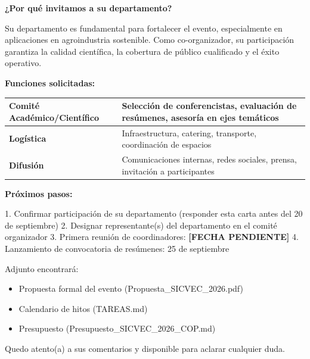 \documentclass[12pt,a4paper]{article}
\begin{document}
\vspace{0.8cm}

\textbf{¿Por qué invitamos a su departamento?}

Su departamento es fundamental para fortalecer el evento, especialmente en aplicaciones en agroindustria sostenible. Como co-organizador, su participación garantiza la calidad científica, la cobertura de público cualificado y el éxito operativo.

\vspace{1cm}

\textbf{Funciones solicitadas:}

\begin{tabular}{|l|p{10cm}|}
\hline
\textbf{Comité Académico/Científico} & Selección de conferencistas, evaluación de resúmenes, asesoría en ejes temáticos \\
\hline
\textbf{Logística} & Infraestructura, catering, transporte, coordinación de espacios \\
\hline
\textbf{Difusión} & Comunicaciones internas, redes sociales, prensa, invitación a participantes \\
\hline
\end{tabular}

\vspace{1cm}

\textbf{Próximos pasos:}

1. Confirmar participación de su departamento (responder esta carta antes del 20 de septiembre)
2. Designar representante(s) del departamento en el comité organizador
3. Primera reunión de coordinadores: \textbf{[FECHA PENDIENTE]}
4. Lanzamiento de convocatoria de resúmenes: 25 de septiembre

\vspace{1cm}

Adjunto encontrará:
\begin{itemize}
  \item Propuesta formal del evento (Propuesta\_SICVEC\_2026.pdf)
  \item Calendario de hitos (TAREAS.md)
  \item Presupuesto (Presupuesto\_SICVEC\_2026\_COP.md)
\end{itemize}

\vspace{1cm}

Quedo atento(a) a sus comentarios y disponible para aclarar cualquier duda.

\vspace{1.5cm}
\end{document}
